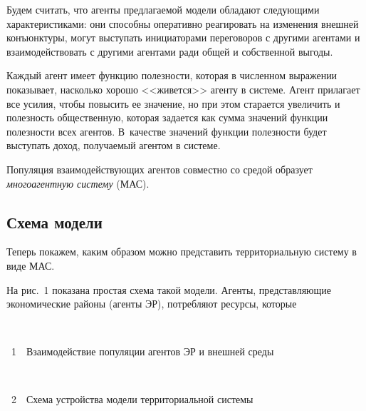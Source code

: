 \begin{multicols}{2}
  Будем считать, что агенты предлагаемой модели обладают сле\-ду\-ющи\-ми 
характеристиками: они способны оперативно реагировать 
на изменения внешней конъюнктуры, могут выступать инициаторами 
переговоров с другими агентами и взаимодействовать с другими агентами ради 
общей и собственной выгоды. 
  
  Каждый агент имеет функцию полезности, которая в численном выражении 
показывает, насколько хорошо <<живется>> агенту в системе. Агент прилагает 
все усилия, чтобы повысить ее значение, но при этом старается увеличить и 
полезность общественную, которая задается как сумма значений функции 
полезности всех агентов. В~качестве значений функции полезности будет 
выступать доход, получаемый агентом в сис\-теме.
  
  Популяция взаимодействующих агентов совместно со средой образует 
\textit{многоагентную систему} (МАС).

\subsection{Схема модели}

  Теперь покажем, каким образом можно представить территориальную 
систему в виде МАС.
  
  На рис.~1 показана простая схема такой модели. Агенты, представляющие 
экономические районы (агенты ЭР), потребляют ресурсы, которые\linebreak\vspace*{-12pt}
\begin{center} %
\vspace*{6pt}
\mbox{%
\epsfxsize=79mm
}
\end{center}
\vspace*{12pt}
{{\figurename~1}\ \ \small{Взаимодействие популяции агентов ЭР и внешней среды}}
\vspace*{9pt}

\bigskip
\addtocounter{figure}{1}

\begin{center} %
\vspace*{6pt}
\mbox{%
\epsfxsize=79mm
}
\end{center}
\vspace*{12pt}
{{\figurename~2}\ \ \small{Схема устройства модели территориальной сис\-те\-мы}}
\vspace*{9pt}


\end{multicols}
